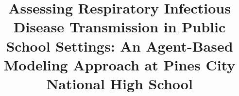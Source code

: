 \documentclass[12pt]{report}
\begin{document}
\title{Assessing Respiratory Infectious Disease Transmission in Public School Settings: An Agent-Based Modeling Approach at Pines City National High School}






  
\bothabsenttrue






\acknowledge{\hspace{6 mm} }
\end{document}

